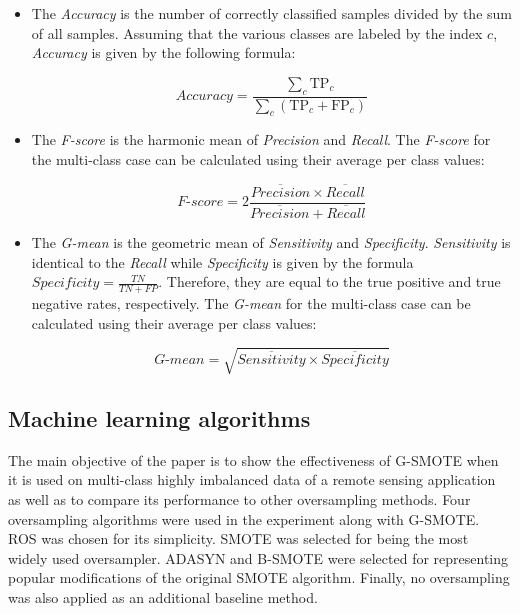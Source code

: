\documentclass[remotesensing,article,submit,moreauthors,pdftex]{Definitions/mdpi}
\begin{document}
\begin{itemize}

	\renewcommand\labelitemi{--}

	\item The \textit{Accuracy} is the number of correctly classified
	samples divided by the sum of all samples. Assuming that the various classes
	are labeled by the index \( c \), \textit{Accuracy} is given by the
	following formula:

	$$\textit{Accuracy} = \frac{ \sum\limits_{c}{ \text{TP}_{c} } }{
	\sum\limits_{c}{ (\text{TP}_{c}  + \text{FP}_{c}) } } $$

	\item The \textit{F-score} is the harmonic mean of \textit{Precision} and
	\textit{Recall}. The \textit{F-score} for the multi-class case can be
	calculated using their average per class values:

	$$\textit{F-score}=2\frac{\overline{Precision} \times \overline{Recall}}{\overline{Precision} +
	\overline{Recall}}$$

	\item The \textit{G-mean} is the geometric mean of \textit{Sensitivity} and
	\textit{Specificity}. \textit{Sensitivity} is identical to the
	\textit{Recall} while \textit{Specificity} is given by the formula
	\(\textit{Specificity} =  \frac{TN}{TN + FP} \). Therefore, they are equal
	to the true positive and true negative rates, respectively. The
	\textit{G-mean} for the multi-class case can be calculated using their
	average per class values:

	$$\textit{G-mean} = \sqrt{ \overline{Sensitivity} \times
	\overline{Specificity}}$$

\end{itemize}

\subsection{Machine learning algorithms}

The main objective of the paper is to show the effectiveness of G-SMOTE when it
is used on multi-class highly imbalanced data of a remote sensing application as
well as to compare its performance to other oversampling methods. Four
oversampling algorithms were used in the experiment along with G-SMOTE. ROS was
chosen for its simplicity. SMOTE was selected for being the most widely used
oversampler. ADASYN and B-SMOTE were selected for representing popular
modifications of the original SMOTE algorithm. Finally, no oversampling was also
applied as an additional baseline method.
\end{document}
